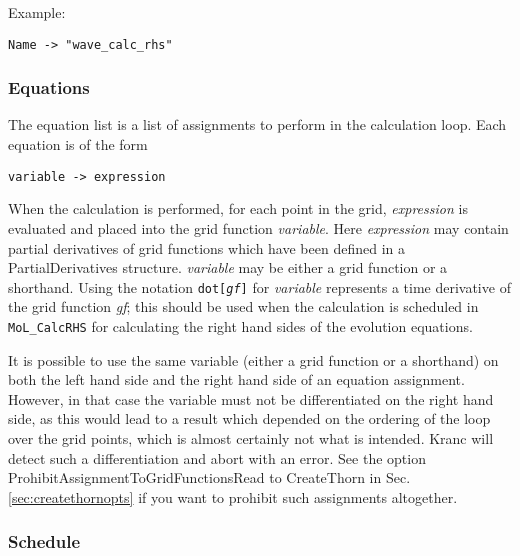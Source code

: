 \documentclass{report}
\begin{document}
Example:

\begin{center}
\begin{minipage}{0.8 \textwidth}
\begin{verbatim}
Name -> "wave_calc_rhs"
\end{verbatim}
\end{minipage}
\end{center}

\subsubsection{Equations}

The equation list is a list of assignments to perform in the
calculation loop.  Each equation is of the form
\begin{center}
\begin{minipage}{0.8 \textwidth}
\begin{verbatim}
variable -> expression
\end{verbatim}
\end{minipage}
\end{center}
When the calculation is performed, for each point in the grid, {\it
expression} is evaluated and placed into the grid function {\it
variable}.  Here {\it expression} may contain partial derivatives of
grid functions which have been defined in a PartialDerivatives
structure.  {\it variable} may be either a grid function or a
shorthand.  Using the notation {\tt dot[{\it gf}]} for {\it variable}
represents a time derivative of the grid function {\it gf}; this
should be used when the calculation is scheduled in {\tt MoL\_CalcRHS}
for calculating the right hand sides of the evolution equations.

It is possible to use the same variable (either a grid function or a
shorthand) on both the left hand side and the right hand side of an
equation assignment.  However, in that case the variable must not be
differentiated on the right hand side, as this would lead to a result
which depended on the ordering of the loop over the grid points, which
is almost certainly not what is intended.  Kranc will detect such a
differentiation and abort with an error.  See the option
ProhibitAssignmentToGridFunctionsRead to CreateThorn in
Sec.\ref{sec:createthornopts} if you want to prohibit such assignments
altogether.

\subsubsection{Schedule}
\end{document}
